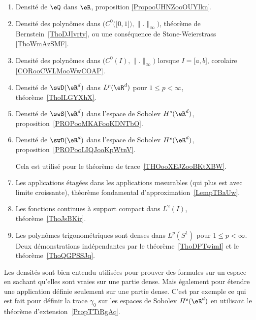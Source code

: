 
         \label{THEooPUIIooLDPUuq}
\begin{enumerate}
	\item
	      Densité de \( \eQ\) dans \( \eR\), proposition \ref{PropooUHNZooOUYIkn}.
	\item
	      Densité des polynômes dans \( \Big( C^0\big( \mathopen[ 0 , 1 \mathclose] \big),\| . \|_{\infty} \Big)\), théorème de Bernstein~\ref{ThoDJIvrty}, ou une conséquence de Stone-Weierstrass \ref{ThoWmAzSMF}.
	\item
	      Densité des polynômes dans \( \big( C^0(I),\| . \|_{\infty} \big)\) lorsque \( I=\mathopen[ a , b \mathclose]\), corolaire \ref{CORooCWLMooWwCOAP}.
	\item
	      Densité de \( \swD(\eR^d)\) dans \( L^p(\eR^d)\) pour \( 1\leq p<\infty\), théorème~\ref{ThoILGYXhX}.
	\item
	      Densité de \( \swS(\eR^d)\) dans l'espace de Sobolev \( H^s(\eR^d)\), proposition~\ref{PROPooMKAFooKDNTbO}.

	\item
	      Densité de \( \swD(\eR^d)\) dans l'espace de Sobolev \( H^s(\eR^d)\), proposition~\ref{PROPooLIQJooKpWtnV}.

	      Cela est utilisé pour le théorème de trace~\ref{THOooXEJZooBKtXBW}.
	\item
	      Les applications étagées dans les applications mesurables (qui plus est avec limite croissante), théorème fondamental d'approximation~\ref{LempTBaUw}.
	\item
	      Les fonctions continues à support compact dans \( L^2(I)\), théorème~\ref{ThoJsBKir}.
	\item
	      Les polynômes trigonométriques sont denses dans \( L^p(S^1)\) pour \( 1\leq p<\infty\). Deux démonstrations indépendantes par le théorème~\ref{ThoDPTwimI} et le théorème~\ref{ThoQGPSSJq}.
\end{enumerate}
Les densités sont bien entendu utilisées pour prouver des formules sur un espace en sachant qu'elles sont vraies sur une partie dense. Mais également pour étendre une application définie seulement sur une partie dense. C'est par exemple ce qui est fait pour définir la trace \( \gamma_0\) sur les espaces de Sobolev \( H^s(\eR^d)\) en utilisant le théorème d'extension~\ref{PropTTiRgAq}.

